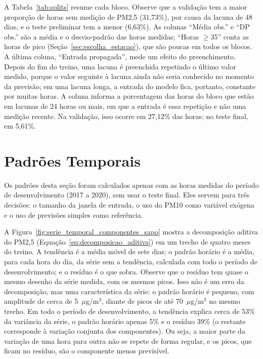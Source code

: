 A Tabela~\ref{tab:splits} resume cada bloco. Observe que a validação tem a maior proporção de horas sem medição de PM2,5 (31,73\%), por causa da lacuna de 48 dias, e o teste preliminar tem a menor (6,63\%). As colunas ``Média obs.'' e ``DP obs.'' são a média e o desvio-padrão das horas medidas; ``Horas \(\geq\)35'' conta as horas de pico (Seção~\ref{sec:escolha_estacao}), que são poucas em todos os blocos. A última coluna, ``Entrada propagada'', mede um efeito do preenchimento. Depois do fim do treino, uma lacuna é preenchida repetindo o último valor medido, porque o valor seguinte à lacuna ainda não seria conhecido no momento da previsão; em uma lacuna longa, a entrada do modelo fica, portanto, constante por muitas horas. A coluna informa a porcentagem das horas do bloco que estão em lacunas de 24 horas ou mais, em que a entrada é essa repetição e não uma medição recente. Na validação, isso ocorre em 27,12\% das horas; no teste final, em 5,61\%.


\section{Padrões Temporais}
\label{sec:padroes_temporais}

Os padrões desta seção foram calculados apenas com as horas medidas do período de desenvolvimento (2017 a 2020), sem usar o teste final. Eles servem para três decisões: o tamanho da janela de entrada, o uso do PM10 como variável exógena e o uso de previsões simples como referência.

A Figura~\ref{fig:serie_temporal_componentes_sapo} mostra a decomposição aditiva do PM2,5 (Equação~\ref{eq:decomposicao_aditiva}) em um trecho de quatro meses do treino. A tendência é a média móvel de sete dias; o padrão horário é a média, para cada hora do dia, da série sem a tendência, calculada com todo o período de desenvolvimento; e o resíduo é o que sobra. Observe que o resíduo tem quase o mesmo desenho da série medida, com os mesmos picos. Isso não é um erro da decomposição, mas uma característica da série: o padrão horário é pequeno, com amplitude de cerca de 5~\(\mu\)g/m\(^3\), diante de picos de até 70~\(\mu\)g/m\(^3\) no mesmo trecho. Em todo o período de desenvolvimento, a tendência explica cerca de 53\% da variância da série, o padrão horário apenas 5\% e o resíduo 39\% (o restante corresponde à variação conjunta dos componentes). Ou seja, a maior parte da variação de uma hora para outra não se repete de forma regular, e os picos, que ficam no resíduo, são o componente menos previsível.

